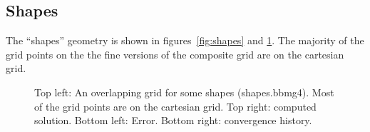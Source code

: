 \documentclass{article}
\begin{document}
\subsection{Shapes}

   The ``shapes'' geometry is shown in figures~\ref{fig:shapes} and \ref{fig:shapes2}. 
The majority of the grid points on the the fine versions of the composite grid are on
the cartesian grid. 

{
\newcommand{\figWidth}{7.cm}
\newcommand{\trimfig}[2]{\trimPlotb{#1}{#2}{.0}{.0}{.0}{.0}}
\begin{figure}[hbt]
\begin{center}
\end{center}
\caption{Top left: An overlapping grid for some shapes (shapes.bbmg4). 
Most of the grid points are on the cartesian grid.
Top right: computed solution. Bottom left: Error. Bottom right: convergence history.
} \label{fig:shapes2}
\end{figure}
}


\end{document}
